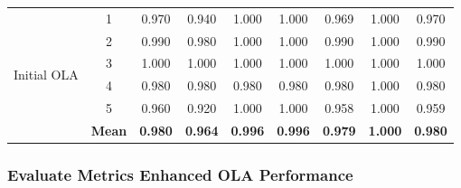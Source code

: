 \documentclass[conference]{IEEEtran}
\begin{document}
\begin{table}[H]
{\begin{tabular}{|l|c|c|c|c|c|c|c|c|}
\hline
\multirow{6}{*}{Initial OLA} 
& 1 & 0.970 & 0.940 & 1.000 & 1.000 & 0.969 & 1.000 & 0.970 \\
& 2 & 0.990 & 0.980 & 1.000 & 1.000 & 0.990 & 1.000 & 0.990 \\
& 3 & 1.000 & 1.000 & 1.000 & 1.000 & 1.000 & 1.000 & 1.000 \\
& 4 & 0.980 & 0.980 & 0.980 & 0.980 & 0.980 & 1.000 & 0.980 \\
& 5 & 0.960 & 0.920 & 1.000 & 1.000 & 0.958 & 1.000 & 0.959 \\
& \textbf{Mean} & \textbf{0.980} & \textbf{0.964} & \textbf{0.996} & \textbf{0.996} & \textbf{0.979} & \textbf{1.000} & \textbf{0.980} \\
\hline
\end{tabular}}
\end{table}


\subsubsection{Evaluate Metrics Enhanced OLA Performance}\mbox{}\\

\begin{table}[H]
\centering
\caption{Single-run performance of models on the private dataset with enhanced OLA (PCA + OLA with TiepXucMat control).}
\label{tab:enhanced_ola_single_run}
\end{table}
\end{document}
